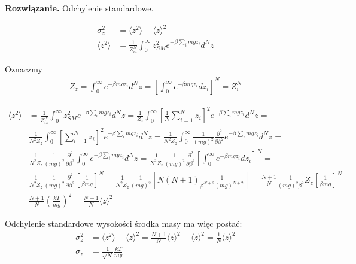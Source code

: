 \documentclass[11pt,a4paper]{article}
\newenvironment{solution}{\vspace{1cm} \par\textbf{Rozwiązanie.} \vspace{1cm}}{}
\begin{document}
\begin{solution}
Odchylenie standardowe.

\begin{align*}
  \sigma^{2}_{z} &= \langle z^2 \rangle - \langle z \rangle^2 \\
  \langle z^2 \rangle &= \frac{1}{Z_{iz}^{N}} \int_{0}^{\infty} z_{SM}^2 e^{-\beta \sum_{i} mgz_i} d^{N}z
\end{align*}

Oznaczmy 
\begin{align*}
Z_{z} = \int_{0}^{\infty} e^{-\beta mgz_i} d^{N}z = 
\left[ \int_{0}^{\infty} e^{-\beta mgz_i} dz_i \right]^{N} = Z_{i}^{N}
\end{align*}

\begin{align*}
  \langle z^2 \rangle &= \frac{1}{Z_{iz}^{N}} \int_{0}^{\infty} z_{SM}^2 e^{-\beta \sum_{i} mgz_i} d^{N}z = 
    \frac{1}{Z_{z}} \int_{0}^{\infty} \left[\frac{1}{N} \sum_{i=1}^{N} z_i \right]^2 e^{-\beta \sum_{i} mgz_i} d^{N}z = \\
    & \frac{1}{N^2 Z_{z}} \int_{0}^{\infty} \left[ \sum_{i=1}^{N} z_i \right]^{2} e^{-\beta \sum_{i} mgz_i} d^{N}z = 
      \frac{1}{N^2 Z_{z}} \int_{0}^{\infty} \frac{1}{(mg)^{2}}  \frac{\partial^{2}}{\partial \beta^{2}} e^{-\beta \sum_{i} mgz_i} d^{N}z = \\
    &  \frac{1}{N^2 Z_{z}}  \frac{1}{(mg)^{2}}  \frac{\partial^{2}}{\partial \beta^{2}}  \int_{0}^{\infty} e^{-\beta \sum_{i} mgz_i} d^{N}z = 
      \frac{1}{N^2 Z_{z}}  \frac{1}{(mg)^{2}}  \frac{\partial^{2}}{\partial \beta^{2}}  \left[ \int_{0}^{\infty} e^{-\beta mgz_i} dz_i \right]^{N} = \\
    & \frac{1}{N^2 Z_{z}}  \frac{1}{(mg)^{2}}  \frac{\partial^{2}}{\partial \beta^{2}}  \left[ \frac{1}{\beta mg} \right]^{N} =
      \frac{1}{N^2 Z_{z}}  \frac{1}{(mg)^{2}}  \left[ N(N+1) \frac{1}{\beta^{N+2} (mg)^{N+2}} \right] = 
        \frac{N+1}{N} \frac{1}{(mg)^{2} \beta^{2}} Z_{z} \left[\frac{1}{\beta mg} \right]^{N} =  \\
        & \frac{N+1}{N} \left( \frac{kT}{mg} \right)^2 = \frac{N+1}{N} \langle z \rangle^2
\end{align*}

Odchylenie standardowe wysokości środka masy ma więc postać:
\begin{align*}
  \sigma_{z}^{2} &= \langle z^2 \rangle - \langle z \rangle^2 = \frac{N+1}{N} \langle z \rangle^2 - \langle z \rangle^2 = \frac{1}{N} \langle z \rangle^2 \\
  \sigma_{z} &= \frac{1}{\sqrt{N}} \frac{kT}{mg}
\end{align*}


\end{solution}
\end{document}
